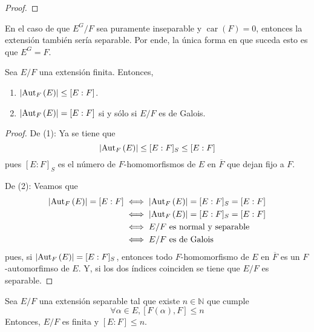 \documentclass[12pt]{report}
\theoremstyle{largebreak}
\newcommand\abs[1]{\ensuremath{\left|#1\right|}}
\DeclareMathOperator{\car}{car}
\begin{document}
    \begin{proof}
        
    \end{proof}

    \begin{obs}
        En el caso de que $E^G/F$ sea puramente inseparable y $\car(F)=0$, entonces la extensión también sería separable. Por ende, la única forma en que suceda esto es que $E^G=F$.
    \end{obs}

    \begin{propo}
        Sea $E/F$ una extensión finita. Entonces,
        \begin{enumerate}
            \item $\abs{\Aut{F}{E}}\leq[E:F]$.
            \item $\abs{\Aut{F}{E}}=[E:F]$ si y sólo si $E/F$ es de Galois.
        \end{enumerate}
    \end{propo}

    \begin{proof}
        De (1): Ya se tiene que
        \begin{equation*}
            \abs{\Aut{F}{E}}\leq[E:F]_S\leq[E:F]
        \end{equation*}
        pues $[E:F]_S$ es el número de $F$-homomorfismos de $E$ en $\overline{F}$ que dejan fijo a $F$.

        De (2): Veamos que
        \begin{equation*}
            \begin{split}
                \abs{\Aut{F}{E}}=[E:F]&\iff \abs{\Aut{F}{E}}=[E:F]_S=[E:F]\\
                &\iff \abs{\Aut{F}{E}}=[E:F]_S=[E:F]\\
                &\iff E/F\textup{ es normal y separable}\\
                &\iff E/F\textup{ es de Galois}\\
            \end{split}
        \end{equation*}
        pues, si $\abs{\Aut{F}{E}}=[E:F]_S$, entonces todo $F$-homomorfismo de $E$ en $\overline{F}$ es un  $F$-automorfimso de $E$. Y, si los dos índices coinciden se tiene que $E/F$ es separable.
    \end{proof}

    \begin{propo}
        Sea $E/F$ una extensión separable tal que existe $n\in\mathbb{N}$ que cumple
        \begin{equation*}
            \forall \alpha\in E,[F(\alpha),F]\leq n
        \end{equation*}
        Entonces, $E/F$ es finita y $[E:F]\leq n$.
    \end{propo}
\end{document}
